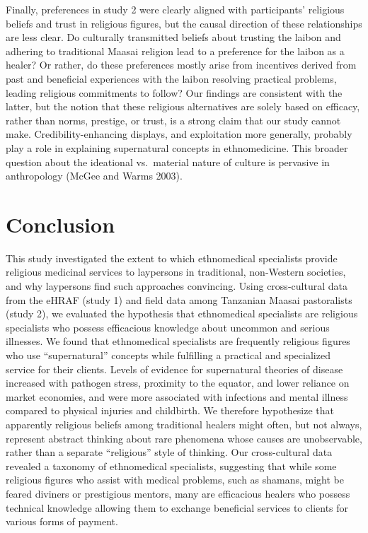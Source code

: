 \documentclass[
  11pt,
]{article}
\begin{document}
Finally, preferences in study 2 were clearly aligned with participants' religious beliefs and trust in religious figures, but the causal direction of these relationships are less clear. Do culturally transmitted beliefs about trusting the laibon and adhering to traditional Maasai religion lead to a preference for the laibon as a healer? Or rather, do these preferences mostly arise from incentives derived from past and beneficial experiences with the laibon resolving practical problems, leading religious commitments to follow? Our findings are consistent with the latter, but the notion that these religious alternatives are solely based on efficacy, rather than norms, prestige, or trust, is a strong claim that our study cannot make. Credibility-enhancing displays, and exploitation more generally, probably play a role in explaining supernatural concepts in ethnomedicine. This broader question about the ideational vs.~material nature of culture is pervasive in anthropology (McGee and Warms 2003).

\hypertarget{conclusion}{%
\section{Conclusion}\label{conclusion}}

This study investigated the extent to which ethnomedical specialists provide religious medicinal services to laypersons in traditional, non-Western societies, and why laypersons find such approaches convincing. Using cross-cultural data from the eHRAF (study 1) and field data among Tanzanian Maasai pastoralists (study 2), we evaluated the hypothesis that ethnomedical specialists are religious specialists who possess efficacious knowledge about uncommon and serious illnesses. We found that ethnomedical specialists are frequently religious figures who use ``supernatural'' concepts while fulfilling a practical and specialized service for their clients. Levels of evidence for supernatural theories of disease increased with pathogen stress, proximity to the equator, and lower reliance on market economies, and were more associated with infections and mental illness compared to physical injuries and childbirth. We therefore hypothesize that apparently religious beliefs among traditional healers might often, but not always, represent abstract thinking about rare phenomena whose causes are unobservable, rather than a separate ``religious'' style of thinking. Our cross-cultural data revealed a taxonomy of ethnomedical specialists, suggesting that while some religious figures who assist with medical problems, such as shamans, might be feared diviners or prestigious mentors, many are efficacious healers who possess technical knowledge allowing them to exchange beneficial services to clients for various forms of payment.
\end{document}
